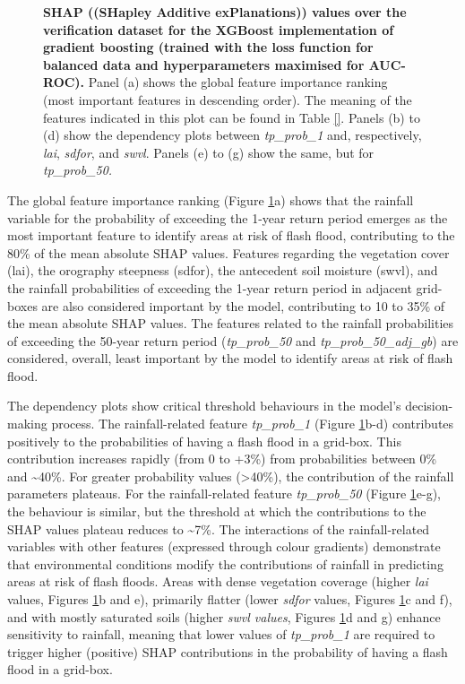 \begin{figure}[htbp]
\caption{\textbf{SHAP ((SHapley Additive exPlanations)) values over the \textcolor{colourTest}{verification dataset} for the  XGBoost implementation of gradient boosting (trained with the loss function for balanced data and hyperparameters maximised for AUC-ROC).} Panel (a) shows the global feature importance ranking (most important features in descending order). The meaning of the features indicated in this plot can be found in Table \ref{}. Panels (b) to (d) show the dependency plots between \textit{tp\_prob\_1} and, respectively, \textit{lai}, \textit{sdfor}, and \textit{swvl}. Panels (e) to (g) show the same, but for \textit{tp\_prob\_50.}}
\label{fig:shap}
\end{figure}

The  global feature importance ranking (Figure \ref{fig:shap}a) shows that the rainfall variable for the probability of exceeding the 1-year return period emerges as the most important feature to identify areas at risk of flash flood, contributing to the 80\% of the mean absolute SHAP values. Features regarding the vegetation cover (lai), the orography steepness (sdfor), the antecedent soil moisture (swvl), and the rainfall probabilities of exceeding the 1-year return period in adjacent grid-boxes are also considered important by the model, contributing to 10 to 35\% of the mean absolute SHAP values. The features related to the rainfall probabilities of exceeding the 50-year return period (\textit{tp\_prob\_50} and \textit{tp\_prob\_50\_adj\_gb}) are considered, overall, least important by the model to identify areas at risk of flash flood. 

The  dependency plots show critical threshold behaviours in the model's decision-making process. The rainfall-related feature \textit{tp\_prob\_1} (Figure \ref{fig:shap}b-d) contributes positively to the probabilities of having a flash flood in a grid-box. This contribution increases rapidly (from 0 to +3\%) from probabilities between 0\% and \sim40\%. For greater probability values (>40\%), the contribution of the rainfall parameters plateaus. For the rainfall-related feature \textit{tp\_prob\_50} (Figure \ref{fig:shap}e-g), the behaviour is similar, but the threshold at which the contributions to the SHAP values plateau reduces to \sim7\%. The interactions of the rainfall-related variables with other features (expressed through colour gradients) demonstrate that environmental conditions modify the contributions of rainfall in predicting areas at risk of flash floods. Areas with dense vegetation coverage (higher \textit{lai} values, Figures \ref{fig:shap}b and e), primarily flatter (lower \textit{sdfor} values, Figures \ref{fig:shap}c and f), and with mostly saturated soils (higher \textit{swvl values}, Figures \ref{fig:shap}d and g) enhance sensitivity to rainfall, meaning that lower values of \textit{tp\_prob\_1} are required to trigger higher (positive) SHAP contributions in the probability of having a flash flood in a grid-box.


